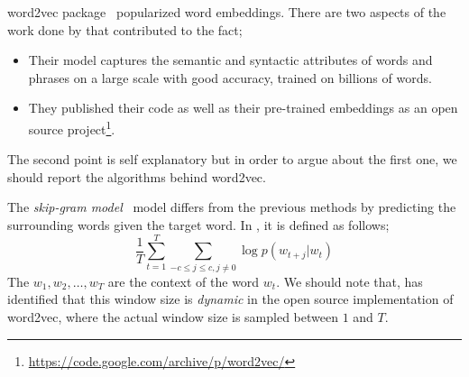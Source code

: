 word2vec package~\cite{mikolov_efficient_2013,mikolov_distributed_2013,mikolov_linguistic_2013} popularized word embeddings.
There are two aspects of the work done by \citeauthor{mikolov_distributed_2013}  that contributed to the fact;
\begin{itemize}
    \item Their model captures the semantic and syntactic attributes of words and phrases on a large scale with good accuracy, trained on billions of words.
    \item They published their code as well as their pre-trained embeddings as an open source project\footnote{\url{https://code.google.com/archive/p/word2vec/}}.
\end{itemize}
The second point is self explanatory but in order to argue about the first one, we should report the algorithms behind word2vec.

The \emph{skip-gram model}~\cite{mikolov_efficient_2013} model differs from the previous methods by predicting the surrounding words given the target word.
In , it is defined as follows;
\begin{equation}
    \frac{1}{T}\sum_{t=1}^{T}\sum_{-c \leq j \leq c, j \neq 0} \log p(w_{t+j}|w_t)
\end{equation}
The $w_{1}, w_{2}, \dots, w_{T}$ are the context of the word $w_t$.
We should note that, \textcite{levy_improving_2015} has identified that this window size is \emph{dynamic} in the open source implementation of word2vec, where the actual window size is sampled between $1$ and $T$.


